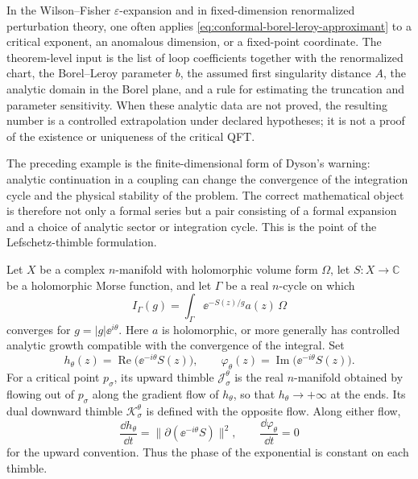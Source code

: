 \begin{remark}
\label{rem:critical-exponent-borel-practice-status}
In the Wilson--Fisher \(\varepsilon\)-expansion and in fixed-dimension
renormalized perturbation theory, one often applies
\eqref{eq:conformal-borel-leroy-approximant} to a critical exponent, an
anomalous dimension, or a fixed-point coordinate.  The theorem-level input is
the list of loop coefficients together with the renormalized chart, the
Borel--Leroy parameter \(b\), the assumed first
singularity distance \(A\), the analytic domain in the Borel plane, and a rule
for estimating the truncation and parameter sensitivity.  When these analytic
data are not proved, the resulting number is a controlled extrapolation under
declared hypotheses; it is not a proof of the existence or uniqueness of the
critical QFT.
\end{remark}

The preceding example is the finite-dimensional form of Dyson's warning:
analytic continuation in a coupling can change the convergence of the
integration cycle and the physical stability of the problem.  The correct
mathematical object is therefore not only a formal series but a pair consisting
of a formal expansion and a choice of analytic sector or integration cycle.
This is the point of the Lefschetz-thimble formulation.

\begin{definition}
\label{def:lefschetz-thimble-data}
Let \(X\) be a complex \(n\)-manifold with holomorphic volume form \(\Omega\),
let \(S:X\to\mathbb C\) be a holomorphic Morse function, and let
\(\Gamma\) be a real \(n\)-cycle on which
\begin{equation}
  I_\Gamma(g)=\int_\Gamma \ee^{-S(z)/g}a(z)\,\Omega
  \label{eq:holomorphic-oscillatory-integral}
\end{equation}
converges for \(g=|g|\ee^{i\theta}\).  Here \(a\) is holomorphic, or more
generally has controlled analytic growth compatible with the convergence of
the integral.  Set
\[
  h_\theta(z)=\operatorname{Re}\bigl(\ee^{-i\theta}S(z)\bigr),
  \qquad
  \varphi_\theta(z)=\operatorname{Im}\bigl(\ee^{-i\theta}S(z)\bigr).
\]
For a critical point \(p_\sigma\), its upward thimble
\(\mathcal J_\sigma^\theta\) is the real \(n\)-manifold obtained by flowing
out of \(p_\sigma\) along the gradient flow of \(h_\theta\), so that
\(h_\theta\to+\infty\) at the ends.  Its dual downward thimble
\(\mathcal K_\sigma^\theta\) is defined with the opposite flow.  Along either
flow,
\begin{equation}
  \frac{\dd h_\theta}{\dd t}
  =
  \|\partial(\ee^{-i\theta}S)\|^2,
  \qquad
  \frac{\dd\varphi_\theta}{\dd t}=0
  \label{eq:thimble-flow-monotonicity}
\end{equation}
for the upward convention.  Thus the phase of the exponential is constant on
each thimble.
\end{definition}


